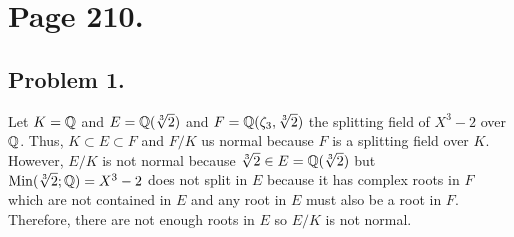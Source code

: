 \documentclass[12pt]{extarticle}
\begin{document}

\section*{Page 210.} 
\subsection*{Problem 1.}
Let $K = \mathbb{Q}$ and $E = \mathbb{Q}(\sqrt[3]{2})$ and $F = \mathbb{Q}(\zeta_3, \sqrt[3]{2})$ the splitting field of $X^3 - 2$ over $\mathbb{Q}$. Thus, $K \subset E \subset F$ and $F/K$ us normal because $F$ is a splitting field over $K$. However, $E/K$ is not normal because $\sqrt[3]{2} \in E = \mathbb{Q}(\sqrt[3]{2})$ but $\mathrm{Min}(\sqrt[3]{2};\mathbb{Q}) = X^3 - 2$ does not split in $E$ because it has complex roots in $F$ which are not contained in $E$ and any root in $E$ must also be a root in $F$. Therefore, there are not enough roots in $E$ so $E/K$ is not normal.
\end{document}
